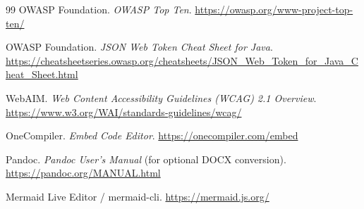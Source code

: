 \documentclass[11pt,a4paper]{article}
\begin{document}
\begin{thebibliography}{99}
OWASP Foundation.
\emph{OWASP Top Ten}.
\url{https://owasp.org/www-project-top-ten/}

OWASP Foundation.
\emph{JSON Web Token Cheat Sheet for Java}.
\url{https://cheatsheetseries.owasp.org/cheatsheets/JSON_Web_Token_for_Java_Cheat_Sheet.html}

WebAIM.
\emph{Web Content Accessibility Guidelines (WCAG) 2.1 Overview}.
\url{https://www.w3.org/WAI/standards-guidelines/wcag/}

OneCompiler.
\emph{Embed Code Editor}.
\url{https://onecompiler.com/embed}

Pandoc.
\emph{Pandoc User's Manual} (for optional DOCX conversion).
\url{https://pandoc.org/MANUAL.html}

Mermaid Live Editor / mermaid-cli.
\url{https://mermaid.js.org/}

\end{thebibliography}
\end{document}
